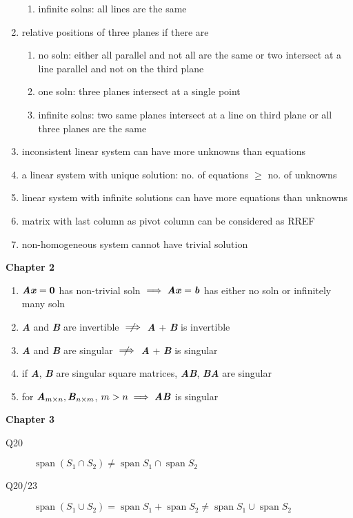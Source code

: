 \documentclass[landscape, a4paper]{article}
\let\geq\geqslant
\newcommand{\V}[1]{\textbf{\textit{#1}}}
\newcommand{\Span}{\operatorname{span}}
\newcommand{\heading}[1]{
    \noindent\textbf{#1}
}
\begin{document}
\begin{multicols*}{4}
\begin{enumerate}
\begin{enumerate}
                  \item infinite solns: all lines are the same
              \end{enumerate}
        \item relative positions of three planes if there are
              \begin{enumerate}
                  \item no soln: either all parallel and not all are the same or two intersect at a line parallel and not on the third plane
                  \item one soln: three planes intersect at a single point
                  \item infinite solns: two same planes intersect at a line on third plane or all three planes are the same
              \end{enumerate}
        \item inconsistent linear system can have more unknowns than equations
        \item a linear system with unique solution: no. of equations $\geq$ no. of unknowns
        \item linear system with infinite solutions can have more equations than unknowns
        \item matrix with last column as pivot column can be considered as RREF
        \item non-homogeneous system cannot have trivial solution
    \end{enumerate}
    \heading{Chapter 2}
    \begin{enumerate}
        \item $\V{Ax}=\textbf{0}$ has non-trivial soln $\implies \V{Ax}=\V{b}$ has either no soln or infinitely many soln
        \item \V{A} and \V{B} are invertible $\centernot\implies$ \V{A} + \V{B} is invertible
        \item \V{A} and \V{B} are singular $\centernot\implies$ \V{A} + \V{B} is singular
        \item if \V{A}, \V{B} are singular square matrices, \V{AB}, \V{BA} are singular
        \item for $\V{A}_{m\times n}, \V{B}_{n\times m}$, $m>n\implies \V{AB}$ is singular
    \end{enumerate}
    \heading{Chapter 3}
    \begin{description}
        \item[Q20] $\Span (S_1 \cap S_2)\neq \Span S_1 \cap \Span S_2$
        \item[Q20/23] $\Span (S_1 \cup S_2) = \Span S_1 + \Span S_2 \neq \Span S_1 \cup \Span S_2$

\end{description}
\end{multicols*}
\end{document}
